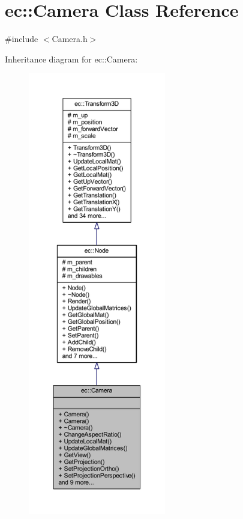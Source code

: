 \hypertarget{classec_1_1_camera}{}\section{ec\+:\+:Camera Class Reference}
\label{classec_1_1_camera}


{\ttfamily \#include $<$Camera.\+h$>$}



Inheritance diagram for ec\+:\+:Camera\+:
\nopagebreak
\begin{figure}[H]
\begin{center}
\leavevmode
\includegraphics[height=550pt]{classec_1_1_camera__inherit__graph}
\end{center}
\end{figure}


